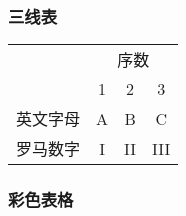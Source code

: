 \documentclass{ctexart}
\begin{document}
        \subsubsection{三线表}
            \begin{tabular}{cccc}
                \toprule
                &\multicolumn{3}{c}{序数}\\
                \cmidrule(l{.25em}r){1-2}\cmidrule[.25ex](lr){3-4}
                &1&2&3\\
                \midrule
                英文字母&A&B&C\\
                罗马数字&I&II&III\\
                \bottomrule
            \end{tabular}

        \subsubsection{彩色表格}
\end{document}
